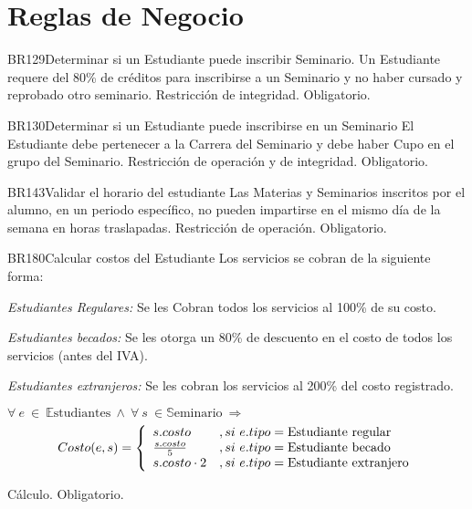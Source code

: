 \section{Reglas de Negocio}

\begin{BussinesRule}{BR129}{Determinar si un Estudiante puede inscribir Seminario.} 
	\BRitem[Descripción:] Un Estudiante requere del 80\% de créditos para inscribirse a un Seminario y no haber cursado y reprobado otro seminario.
	\BRitem[Tipo:] Restricción de integridad.
	\BRitem[Nivel:] Obligatorio.
\end{BussinesRule}

\begin{BussinesRule}{BR130}{Determinar si un Estudiante puede inscribirse en un Seminario}
	\BRitem[Descripción:] El Estudiante debe pertenecer a la Carrera del Seminario y debe haber Cupo en el grupo del Seminario.
	\BRitem[Tipo:] Restricción de operación y de integridad.
	\BRitem[Nivel:] Obligatorio.
\end{BussinesRule}

\begin{BussinesRule}{BR143}{Validar el horario del estudiante}
	\BRitem[Descripción:] Las Materias y Seminarios inscritos por el alumno, en un periodo específico, no pueden impartirse en el mismo día de la semana en horas traslapadas.
	\BRitem[Tipo:] Restricción de operación.
	\BRitem[Nivel:] Obligatorio.
\end{BussinesRule}

\begin{BussinesRule}{BR180}{Calcular costos del Estudiante}
	\BRitem[Descripción:] Los servicios se cobran de la siguiente forma:
		\begin{Citemize}
			\item {\em Estudiantes Regulares:} Se les Cobran todos los servicios al 100\% de su costo.
			\item {\em Estudiantes becados:} Se les otorga un 80\% de descuento en el costo de todos los servicios (antes del IVA).
			\item {\em Estudiantes extranjeros:} Se les cobran los servicios al 200\% del costo registrado.
		\end{Citemize}
	\BRitem[Sentencia:] $\forall~e~\in~\mathbb{E}\textrm{studiantes}~\land~\forall~s~\in \mathbb{S}\textrm{eminario}~\Rightarrow$
		\begin{displaymath}
			Costo(e,s) = \left\{ \begin{array}{ll}
			s.costo & , si~e.tipo = \textrm{Estudiante regular}\\
			{s.costo}\over{5} & , si~e.tipo = \textrm{Estudiante becado}\\
			s.costo \cdot 2 & , si~e.tipo = \textrm{Estudiante extranjero}
			\end{array} \right.
		\end{displaymath}

	\BRitem[Tipo:] Cálculo.
	\BRitem[Nivel:] Obligatorio.
\end{BussinesRule}

